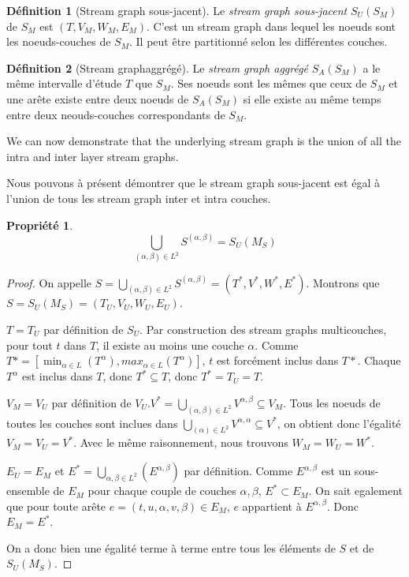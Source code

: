 \documentclass[11pt,a4paper]{article}
\newtheorem{prop}{Propriété}
\theoremstyle{definition}
\newtheorem{defn}{Définition}
\theoremstyle{remark}
\theoremstyle{remark}
\def \stg {stream graph}
\def \Stg {Stream graph}
\def \stgms {stream graphs multicouches}
\begin{document}
	

	
	\begin{defn}[\Stg{} sous-jacent]
	Le {\em \stg{} sous-jacent} $S_U(S_M)$ de $S_M$ est $(T,V_M,W_M,E_M)$. C'est un \stg{} dans lequel les noeuds sont les noeuds-couches de $S_M$. Il peut être partitionné selon les différentes couches.
	\end{defn}
	
	\begin{defn}[\Stg aggrégé]
		Le {\em \stg{} aggrégé} $S_A(S_M)$ a le même intervalle d'étude $T$ que $S_M$. Ses noeuds sont les mêmes que ceux de $S_M$ et une arête existe entre deux noeuds de $S_A(S_M)$ si elle existe au même temps entre deux neouds-couches correspondants de $S_M$. 
	\end{defn}
	
	We can now demonstrate that the underlying stream graph is the union of all the intra and inter layer stream graphs.
	
	Nous pouvons à présent démontrer que le \stg{} sous-jacent est égal à l'union de tous les \stg{} inter et intra couches.
	
		
	\begin{prop}
		\[
			\bigcup_{(\alpha,\beta) \in L^2} S^{(\alpha,\beta)} = S_U(M_S)
		\]
	\end{prop}
	\begin{proof}
	On appelle $S=\bigcup_{(\alpha,\beta) \in L^2} S^{(\alpha,\beta)}=(T^{*},V^{*},W^{*},E^{*})$. Montrons que $S=S_U(M_S)= (T_U,V_U,W_U,E_U)$.
	
	$T=T_U$ par définition de $S_U$. Par construction des \stgms{}, pour tout $t$ dans $T$, il existe au moins une couche $\alpha$. Comme $T* = [\min_{\alpha \in L} (T^{\alpha}),max_{\alpha \in L} (T^{\alpha})]$, $t$ est forcément inclus dans $T*$. Chaque $T^{\alpha}$ est inclus dans $T$, donc $T^* \subseteq T$, donc $T^*=T_U=T$.
	
	$V_M = V_U$ par définition de $V_U$.$V^{*}=\bigcup_{(\alpha,\beta) \in L^2} V^{\alpha,\beta} \subseteq V_M$. Tous les noeuds de toutes les couches sont inclues dans $\bigcup_{(\alpha) \in L^2} V^{\alpha,\alpha} \subseteq V^{*}$, on obtient donc l'égalité $V_M=V_U=V^*$.
	Avec le même raisonnement, nous trouvons $W_M=W_U=W^*$.
	
	$E_U=E_M$ et $E^{*}=\bigcup_{\alpha,\beta \in L^2}(E^{\alpha,\beta})$ par définition. Comme $E^{\alpha,\beta}$ est un sous-ensemble de $E_M$ pour chaque couple de couches $\alpha,\beta$, $E^{*} \subset E_M$. On sait egalement que pour toute arête $e =(t,u,\alpha,v,\beta) \in E_M$, $e$ appartient à $E^{\alpha,\beta}$. Donc $E_M=E^{*}$.


On a donc bien une égalité terme à terme entre tous les éléments de $S$ et de $S_U(M_S)$.					
	\end{proof}
\end{document}

